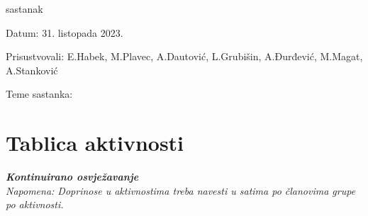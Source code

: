 \begin{packed_enum}
			\item  sastanak
			\item[] \begin{packed_item}
				\item Datum: 31. listopada 2023.
				\item Prisustvovali: E.Habek, M.Plavec, A.Dautović, L.Grubišin, A.Đurđević, M.Magat, A.Stanković
				\item Teme sastanka:
				\begin{packed_item}
					\item 
					\item 
					\item 
					\item 
				\end{packed_item}
			\end{packed_item}
			
		\end{packed_enum}
		
		\eject
		\section*{Tablica aktivnosti}
		
			\textbf{\textit{Kontinuirano osvježavanje}}\\
			
			 \textit{Napomena: Doprinose u aktivnostima treba navesti u satima po članovima grupe po aktivnosti.}

